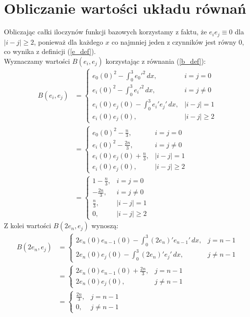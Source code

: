 \documentclass[a4paper,12pt]{article}
\begin{document}
    \section{Obliczanie wartości układu równań}
    Obliczając całki iloczynów funkcji bazowych korzystamy z faktu, że \(e_i e_j \equiv 0\) dla \(|i-j| \geq 2\), ponieważ dla każdego \(x\) co najmniej jeden z czynników jest równy 0, co wynika z definicji (\ref{e_def}).\\
    Wyznaczamy wartości \(B(e_i, e_j)\) korzystając z równania (\ref{b_def}):
    \begin{align}
        B(e_i, e_j) &=
        \begin{cases}
            e_0(0)^2 - \int_{0}^{3} e_0'^2\,dx,& i = j = 0 \\
            e_i(0)^2 - \int_{0}^{3} e_i'^2\,dx,& i = j \neq 0 \\
            e_i(0)e_j(0) - \int_{0}^{3} e_i' e_j'\,dx,& |i-j| = 1 \\
            e_i(0)e_j(0),& |i-j| \geq 2
        \end{cases} \nonumber \\
        &=
        \begin{cases}
            e_0(0)^2 - \frac{n}{3},& i = j = 0 \\
            e_i(0)^2 - \frac{2n}{3},& i = j \neq 0 \\
            e_i(0)e_j(0) + \frac{n}{3},& |i-j| = 1 \\
            e_i(0)e_j(0),& |i-j| \geq 2
        \end{cases} \nonumber \\
        &=
        \begin{cases}
            1-\frac{n}{3},& i = j = 0 \\
            -\frac{2n}{3},& i = j \neq 0 \\
            \frac{n}{3},& |i-j| = 1 \\
            0,& |i-j| \geq 2
        \end{cases} \label{bij_val}
    \end{align}
    Z kolei wartości \(B(2e_n, e_j)\) wynoszą:
    \begin{align}
        B(2e_n, e_j) &=
        \begin{cases}
            2e_n(0)e_{n-1}(0) - \int_{0}^{3} (2e_n)' e_{n-1}'\,dx,& j = n-1 \\
            2e_n(0)e_j(0) - \int_{0}^{3} (2e_n)' e_j'\,dx,& j \neq n-1
        \end{cases} \nonumber \\
        &=
        \begin{cases}
            2e_n(0)e_{n-1}(0) + \frac{2n}{3},& j = n-1 \\
            2e_n(0)e_j(0),& j \neq n-1
        \end{cases} \nonumber \\
        &=
        \begin{cases}
            \frac{2n}{3},& j = n-1 \\
            0,& j \neq n-1
        \end{cases} \label{bnj_val}
    \end{align}
\end{document}

